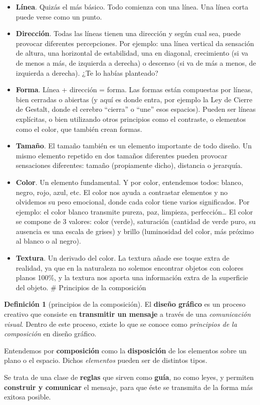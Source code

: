 \documentclass[
  16pt,
]{krantz}
\theoremstyle{definition}
\newtheorem{definition}{Definición}[chapter]
\theoremstyle{definition}
\theoremstyle{definition}
\theoremstyle{definition}
\theoremstyle{remark}
\begin{document}
\begin{itemize}
\item
  \textbf{Línea}. Quizás el más básico. Todo comienza con una línea. Una línea corta puede verse como un punto.
\item
  \textbf{Dirección}. Todas las líneas tienen una dirección y según cual sea, puede provocar diferentes percepciones. Por ejemplo: una línea vertical da sensación de altura, una horizontal de estabilidad, una en diagonal, crecimiento (si va de menos a más, de izquierda a derecha) o descenso (si va de más a menos, de izquierda a derecha). ¿Te lo habías planteado?
\item
  \textbf{Forma}. Línea + dirección = forma. Las formas están compuestas por líneas, bien cerradas o abiertas (y aquí es donde entra, por ejemplo la Ley de Cierre de Gestalt, donde el cerebro ``cierra'' o ``une'' esos espacios). Pueden ser líneas explícitas, o bien utilizando otros principios como el contraste, o elementos como el color, que también crean formas.
\item
  \textbf{Tamaño}. El tamaño también es un elemento importante de todo diseño. Un mismo elemento repetido en dos tamaños diferentes pueden provocar sensaciones diferentes: tamaño (propiamente dicho), distancia o jerarquía.
\item
  \textbf{Color}. Un elemento fundamental. Y por color, entendemos todos: blanco, negro, rojo, azul, etc. El color nos ayuda a contrastar elementos y no olvidemos su peso emocional, donde cada color tiene varios significados. Por ejemplo: el color blanco transmite pureza, paz, limpieza, perfección\ldots{} El color se compone de 3 valores: color (verde), saturación (cantidad de verde puro, su ausencia es una escala de grises) y brillo (luminosidad del color, más próximo al blanco o al negro).
\item
  \textbf{Textura}. Un derivado del color. La textura añade ese toque extra de realidad, ya que en la naturaleza no solemos encontrar objetos con colores planos 100\%, y la textura nos aporta una información extra de la superficie del objeto. \# Principios de la composición
\end{itemize}

\begin{definition}[principios de la composición]
\protect\hypertarget{def:www}{}\label{def:www}El \textbf{diseño gráfico} es un proceso creativo que consiste en \textbf{transmitir un mensaje} a través de una \emph{comunicación visual}. Dentro de este proceso, existe lo que se conoce como \emph{principios de la composición} en diseño gráfico.

Entendemos por \textbf{composición} como la \textbf{disposición} de los elementos sobre un plano o el espacio. Dichos \emph{elementos} pueden ser de distintos tipos.

Se trata de una clase de \textbf{reglas} que sirven como \textbf{guía}, no como leyes, y permiten \textbf{construir y comunicar} el mensaje, para que éste se transmita de la forma más exitosa posible.
\end{definition}
\end{document}
